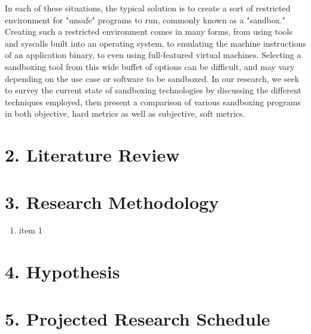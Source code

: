 \documentclass{proc}
\begin{document}
In each of these situations, the typical solution is to create a sort of restricted environment for "unsafe" programs to run, commonly known as a "sandbox." Creating such a restricted environment comes in many forms, from using tools and syscalls built into an operating system, to emulating the machine instructions of an application binary, to even using full-featured virtual machines. Selecting a sandboxing tool from this wide buffet of options can be difficult, and may vary depending on the use case or software to be sandboxed. In our research, we seek to survey the current state of sandboxing technologies by discussing the different techniques employed, then present a comparison of various sandboxing programs in both objective, hard metrics as well as subjective, soft metrics.

\section*{2. Literature Review}

\section*{3. Research Methodology}

\begin{enumerate}
\item item 1
\end{enumerate}

\section*{4. Hypothesis}

\section*{5. Projected Research Schedule}






\end{document}
